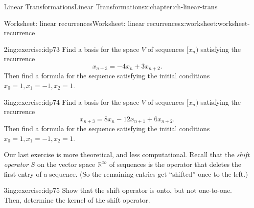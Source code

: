 \documentclass[oneside,10pt,]{book}
\numberwithin{equation}{section}
\newcommand{\R}{\mathbb{R}}
\begin{document}
\begin{chapterptx}{Linear Transformations}{}{Linear Transformations}{}{}{x:chapter:ch-linear-trans}
\begin{worksheet-section}{Worksheet: linear recurrences}{}{Worksheet: linear recurrences}{}{}{x:worksheet:worksheet-recurrence}
\begin{divisionexercise}{2}{}{2in}{g:exercise:idp73}%
Find a basis for the space \(V\) of sequences \([x_n)\) satisfying the recurrence%
\begin{equation*}
x_{n+3} = -4x_n+3x_{n+2}\text{.}
\end{equation*}
Then find a formula for the sequence satisfying the initial conditions \(x_0=1, x_1=-1, x_2=1\).%
\end{divisionexercise}%
\clearpage
\begin{divisionexercise}{3}{}{3in}{g:exercise:idp74}%
Find a basis for the space \(V\) of sequences \([x_n)\) satisfying the recurrence%
\begin{equation*}
x_{n+3} = 8x_n-12x_{n+1}+6x_{n+2}\text{.}
\end{equation*}
Then find a formula for the sequence satisfying the initial conditions \(x_0=1, x_1=-1, x_2=1\).%
\end{divisionexercise}%
Our last exercise is more theoretical, and less computational. Recall that the \emph{shift operator} \(S\) on the vector space \(\R^\infty\) of sequences is the operator that deletes the first entry of a sequence. (So the remaining entries get ``shifted'' once to the left.)%
\begin{divisionexercise}{4}{}{3in}{g:exercise:idp75}%
Show that the shift operator is onto, but not one-to-one. Then, determine the kernel of the shift operator.%
\end{divisionexercise}%
\end{worksheet-section}
\restoregeometry
\end{chapterptx}
%
%
\typeout{************************************************}
\typeout{************************************************}
%
\end{document}
